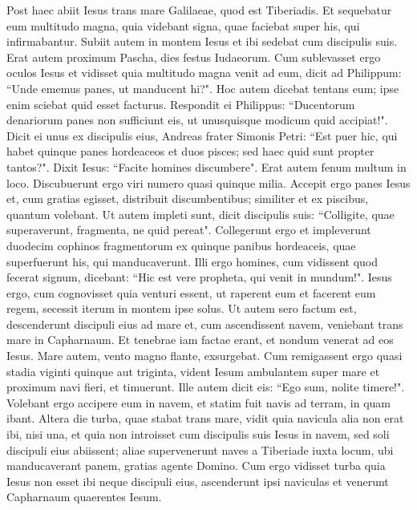 \begin{biblechapter} 
\verse Post haec abiit Iesus trans mare Galilaeae, quod est Tiberiadis. 
\verse Et sequebatur eum multitudo magna, quia videbant signa, quae faciebat super his, qui infirmabantur. 
\verse Subiit autem in montem Iesus et ibi sedebat cum discipulis suis. 
\verse Erat autem proximum Pascha, dies festus Iudaeorum. 
\verse Cum sublevasset ergo oculos Iesus et vidisset quia multitudo magna venit ad eum, dicit ad Philippum: “Unde ememus panes, ut manducent hi?". 
\verse Hoc autem dicebat tentans eum; ipse enim sciebat quid esset facturus. 
\verse Respondit ei Philippus: “Ducentorum denariorum panes non sufficiunt eis, ut unusquisque modicum quid accipiat!". 
\verse Dicit ei unus ex discipulis eius, Andreas frater Simonis Petri: 
\verse “Est puer hic, qui habet quinque panes hordeaceos et duos pisces; sed haec quid sunt propter tantos?". 
\verse Dixit Iesus: “Facite homines discumbere". Erat autem fenum multum in loco. Discubuerunt ergo viri numero quasi quinque milia. 
\verse Accepit ergo panes Iesus et, cum gratias egisset, distribuit discumbentibus; similiter et ex piscibus, quantum volebant. 
\verse Ut autem impleti sunt, dicit discipulis suis: “Colligite, quae superaverunt, fragmenta, ne quid pereat". 
\verse Collegerunt ergo et impleverunt duodecim cophinos fragmentorum ex quinque panibus hordeaceis, quae superfuerunt his, qui manducaverunt. 
\verse Illi ergo homines, cum vidissent quod fecerat signum, dicebant: “Hic est vere propheta, qui venit in mundum!". 
\verse Iesus ergo, cum cognovisset quia venturi essent, ut raperent eum et facerent eum regem, secessit iterum in montem ipse solus. 
\verse Ut autem sero factum est, descenderunt discipuli eius ad mare 
\verse et, cum ascendissent navem, veniebant trans mare in Capharnaum. Et tenebrae iam factae erant, et nondum venerat ad eos Iesus. 
\verse Mare autem, vento magno flante, exsurgebat. 
\verse Cum remigassent ergo quasi stadia viginti quinque aut triginta, vident Iesum ambulantem super mare et proximum navi fieri, et timuerunt. 
\verse Ille autem dicit eis: “Ego sum, nolite timere!". 
\verse Volebant ergo accipere eum in navem, et statim fuit navis ad terram, in quam ibant. 
\verse Altera die turba, quae stabat trans mare, vidit quia navicula alia non erat ibi, nisi una, et quia non introisset cum discipulis suis Iesus in navem, sed soli discipuli eius abiissent; 
\verse aliae supervenerunt naves a Tiberiade iuxta locum, ubi manducaverant panem, gratias agente Domino. 
\verse Cum ergo vidisset turba quia Iesus non esset ibi neque discipuli eius, ascenderunt ipsi naviculas et venerunt Capharnaum quaerentes Iesum. 

\end{biblechapter}
